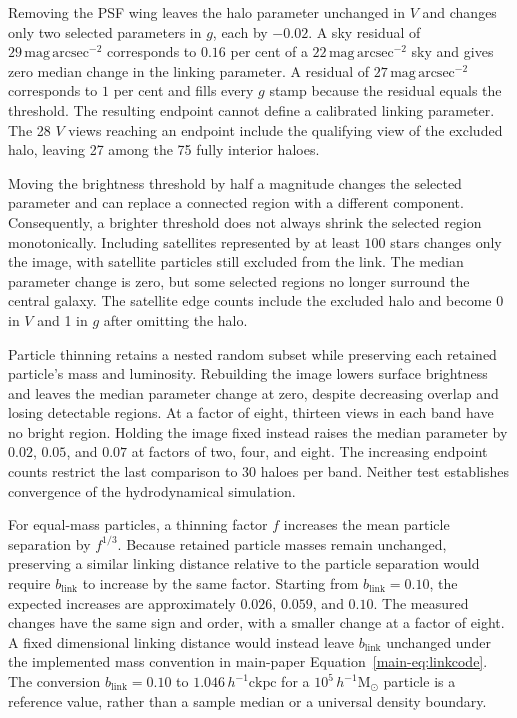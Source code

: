 \documentclass[usenatbib]{mnras}
\begin{document}
Removing the PSF wing leaves the halo parameter unchanged in $V$ and
changes only two selected parameters in $g$, each by $-0.02$.
A sky residual of $29\,\mathrm{mag\,arcsec}^{-2}$ corresponds to
$0.16$ per cent of a $22\,\mathrm{mag\,arcsec}^{-2}$ sky and gives
zero median change in the linking parameter.
A residual of $27\,\mathrm{mag\,arcsec}^{-2}$ corresponds to $1$ per
cent and fills every $g$ stamp because the residual equals the threshold.
The resulting endpoint cannot define a calibrated linking parameter.
The 28 $V$ views reaching an endpoint include the qualifying view of
the excluded halo, leaving 27 among the 75 fully interior haloes.

Moving the brightness threshold by half a magnitude changes the selected
parameter and can replace a connected region with a different component.
Consequently, a brighter threshold does not always shrink the selected
region monotonically.
Including satellites represented by at least $100$ stars changes only
the image, with satellite particles still excluded from the link.
The median parameter change is zero, but some selected regions no longer
surround the central galaxy.
The satellite edge counts include the excluded halo and become 0 in $V$
and 1 in $g$ after omitting the halo.



Particle thinning retains a nested random subset while preserving each
retained particle's mass and luminosity.
Rebuilding the image lowers surface brightness and leaves the median
parameter change at zero, despite decreasing overlap and losing detectable
regions.
At a factor of eight, thirteen views in each band have no bright region.
Holding the image fixed instead raises the median parameter by $0.02$,
$0.05$, and $0.07$ at factors of two, four, and eight.
The increasing endpoint counts restrict the last comparison to 30 haloes
per band.
Neither test establishes convergence of the hydrodynamical simulation.

For equal-mass particles, a thinning factor $f$ increases the mean
particle separation by $f^{1/3}$.
Because retained particle masses remain unchanged, preserving a similar
linking distance relative to the particle separation would require
$b_{\mathrm{link}}$ to increase by the same factor.
Starting from $b_{\mathrm{link}}=0.10$, the expected increases are approximately
$0.026$, $0.059$, and $0.10$.
The measured changes have the same sign and order, with a smaller change
at a factor of eight.
A fixed dimensional linking distance would instead leave $b_{\mathrm{link}}$ unchanged
under the implemented mass convention in main-paper Equation~\eqref{main-eq:linkcode}.
The conversion $b_{\mathrm{link}}=0.10$ to $1.046\,h^{-1}\mathrm{ckpc}$ for a
$10^{5}\,h^{-1}\mathrm{M}_{\odot}$ particle is a reference value, rather than a
sample median or a universal density boundary.
\end{document}
